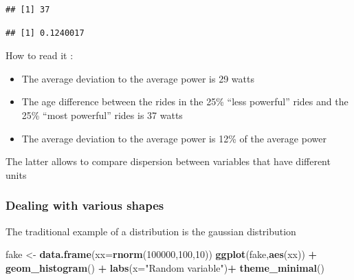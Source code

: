 \documentclass[
]{book}
\newenvironment{Shaded}{\begin{snugshade}}{\end{snugshade}}
\newcommand{\CommentTok}[1]{\textcolor[rgb]{0.56,0.35,0.01}{\textit{#1}}}
\newcommand{\DataTypeTok}[1]{\textcolor[rgb]{0.13,0.29,0.53}{#1}}
\newcommand{\DecValTok}[1]{\textcolor[rgb]{0.00,0.00,0.81}{#1}}
\newcommand{\KeywordTok}[1]{\textcolor[rgb]{0.13,0.29,0.53}{\textbf{#1}}}
\newcommand{\NormalTok}[1]{#1}
\newcommand{\OperatorTok}[1]{\textcolor[rgb]{0.81,0.36,0.00}{\textbf{#1}}}
\newcommand{\StringTok}[1]{\textcolor[rgb]{0.31,0.60,0.02}{#1}}
\providecommand{\tightlist}{%
  \setlength{\itemsep}{0pt}\setlength{\parskip}{0pt}}
\begin{document}
\begin{verbatim}
## [1] 37
\end{verbatim}

\begin{Shaded}
\end{Shaded}

\begin{verbatim}
## [1] 0.1240017
\end{verbatim}

How to read it :

\begin{itemize}
\tightlist
\item
  The average deviation to the average power is 29 watts
\item
  The age difference between the rides in the 25\% ``less powerful'' rides and the 25\% ``most powerful'' rides is 37 watts
\item
  The average deviation to the average power is 12\% of the average power
\end{itemize}

The latter allows to compare dispersion between variables that have different units

\hypertarget{dealing-with-various-shapes}{%
\subsubsection{Dealing with various shapes}\label{dealing-with-various-shapes}}

The traditional example of a distribution is the gaussian distribution

\begin{Shaded}
\begin{Highlighting}[]
\NormalTok{fake <-}\StringTok{ }\KeywordTok{data.frame}\NormalTok{(}\DataTypeTok{xx=}\KeywordTok{rnorm}\NormalTok{(}\DecValTok{100000}\NormalTok{,}\DecValTok{100}\NormalTok{,}\DecValTok{10}\NormalTok{))}
\KeywordTok{ggplot}\NormalTok{(fake,}\KeywordTok{aes}\NormalTok{(xx)) }\OperatorTok{+}\StringTok{ }\KeywordTok{geom_histogram}\NormalTok{() }\OperatorTok{+}\StringTok{ }\KeywordTok{labs}\NormalTok{(}\DataTypeTok{x=}\StringTok{"Random variable"}\NormalTok{)}\OperatorTok{+}\StringTok{ }\KeywordTok{theme_minimal}\NormalTok{()}
\end{Highlighting}
\end{Shaded}
\end{document}
